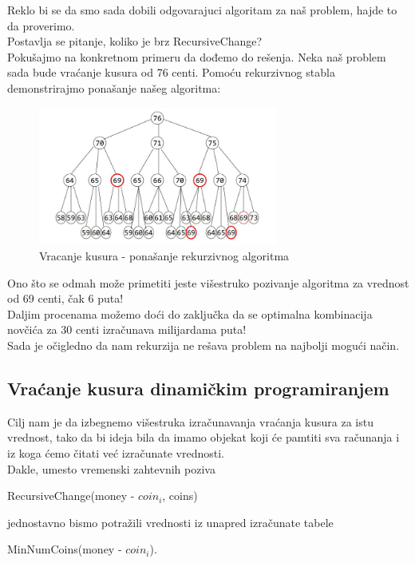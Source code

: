 Reklo bi se da smo sada dobili odgovarajuci algoritam za naš problem, hajde to da proverimo. \\
Postavlja se pitanje, koliko je brz RecursiveChange? \\

Pokušajmo na konkretnom primeru da dođemo do rešenja. Neka naš problem sada bude vraćanje kusura od 76 centi. Pomoću rekurzivnog stabla demonstrirajmo ponašanje našeg algoritma: \\

\begin{figure}[h!]
\centering
\includegraphics[width=0.7\textwidth]{poglavlja/5/slike/rekurzivnoStablo.JPG}
\caption{Vracanje kusura - ponašanje rekurzivnog algoritma}
\label{slika:rekurzija2}
\end{figure}

Ono što se odmah može primetiti jeste višestruko pozivanje algoritma za vrednost od 69 centi, čak 6 puta! \\
Daljim procenama možemo doći do zaključka da se optimalna kombinacija novčića za 30 centi izračunava milijardama puta! \\

Sada je očigledno da nam rekurzija ne rešava problem na najbolji mogući način. \\

\subsection{Vraćanje kusura dinamičkim programiranjem}

Cilj nam je da izbegnemo višestruka izračunavanja  vraćanja kusura za istu vrednost, tako da bi ideja bila da imamo objekat koji će pamtiti sva računanja i iz koga ćemo čitati već izračunate vrednosti. \\
Dakle, umesto vremenski zahtevnih poziva \\
\begin{center}
RecursiveChange(money - $coin_{i}$, coins)
\end{center}
jednostavno bismo potražili vrednosti iz unapred izračunate tabele \\
\begin{center}
MinNumCoins(money - $coin_{i}$).
\end{center}


